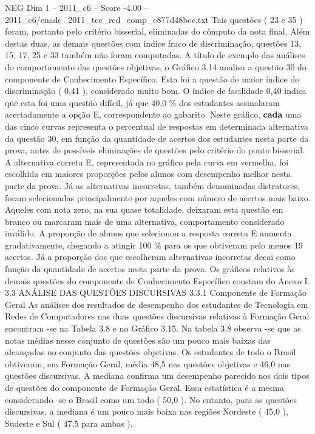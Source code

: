\begin{textsample}{NEG Dim 1 – 2011\_c6 – Score -4.00 – 2011\_c6/enade\_2011\_tec\_red\_comp\_c877d48bcc.txt}
Tais questões ( 23 e 35 ) foram, portanto pelo critério bisserial, eliminadas do cômputo da nota final.
Além destas duas, as demais questões com índice fraco de discriminação, questões 13, 15, 17, 25 e 33 também não foram computadas.
A título de exemplo das análises do comportamento das questões objetivas, o Gráfico 3.14 analisa a questão 30 do componente de Conhecimento Específico.
Esta foi a questão de maior índice de discriminação ( 0,41 ), considerado muito bom.
O índice de facilidade 0,40 indica que esta foi uma questão difícil, já que 40,0 \% dos estudantes assinalaram acertadamente a opção E, correspondente ao gabarito.
Neste gráfico, \textbf{cada} uma das cinco curvas representa o percentual de respostas em determinada alternativa da questão 30, em função da quantidade de acertos dos estudantes nesta parte da prova, antes de possíveis eliminações de questões pelo critério do ponto bisserial.
A alternativa correta E, representada no gráfico pela curva em vermelha, foi escolhida em maiores proporções pelos alunos com desempenho melhor nesta parte da prova.
Já as alternativas incorretas, também denominadas distratores, foram selecionadas principalmente por aqueles com número de acertos mais baixo.
Aqueles com nota zero, na sua quase totalidade, deixaram esta questão em branco ou marcaram mais de uma alternativa, comportamento considerado inválido.
A proporção de alunos que selecionou a resposta correta E aumenta gradativamente, chegando a atingir 100 \% para os que obtiveram pelo menos 19 acertos.
Já a proporção dos que escolheram alternativas incorretas decai como função da quantidade de acertos nesta parte da prova.
Os gráficos relativos às demais questões do componente de Conhecimento Específico constam do Anexo I. 3.3 ANÁLISE DAS QUESTÕES DISCURSIVAS 3.3.1 Componente de Formação Geral As análises dos resultados de desempenho dos estudantes de Tecnologia em Redes de Computadores nas duas questões discursivas relativas à Formação Geral encontram -se na Tabela 3.8 e no Gráfico 3.15.
Na tabela 3.8 observa -se que as notas médias nesse conjunto de questões são um pouco mais baixas das alcançadas no conjunto das questões objetivas.
Os estudantes de todo o Brasil obtiveram, em Formação Geral, média 48,5 nas questões objetivas e 46,0 nas questões discursivas.
A mediana confirma um desempenho parecido nos dois tipos de questões do componente de Formação Geral.
Essa estatística é a mesma considerando -se o Brasil como um todo ( 50,0 ).
No entanto, para as questões discursivas, a mediana é um pouco mais baixa nas regiões Nordeste ( 45,0 ), Sudeste e Sul ( 47,5 para ambas ).

\end{textsample}
